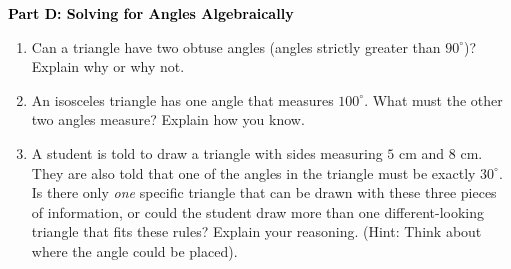 \documentclass[12pt, letterpaper, fleqn]{article}
\newcommand{\blank}{\underline{\hspace{2.2cm}}}
\begin{document}
\newpage

\begin{tcolorbox}[colback=customteal!20]
\large\textcolor{black}{\textbf{Part D: Solving for Angles Algebraically}}
\end{tcolorbox}

\vspace{3mm}

\begin{enumerate}[itemsep=5.5cm, leftmargin=0.6cm, resume]
\begin{itemize}
\item Challenge: $z =$ \blank
\item Challenge: Angle Kevin: \blank
\end{itemize}
\item Can a triangle have two obtuse angles (angles strictly greater than $90^\circ$)? Explain why or why not.
\item An isosceles triangle has one angle that measures $100^\circ$. What must the other two angles measure? Explain how you know.
\item A student is told to draw a triangle with sides measuring $5\text{ cm}$ and $8\text{ cm}$. They are also told that one of the angles in the triangle must be exactly $30^\circ$. Is there only \textit{one} specific triangle that can be drawn with these three pieces of information, or could the student draw more than one different-looking triangle that fits these rules? Explain your reasoning. (Hint: Think about where the angle could be placed).
\end{enumerate}
\end{document}
